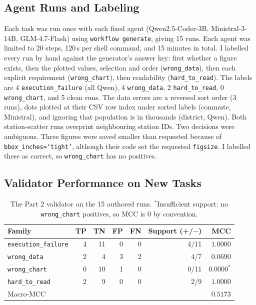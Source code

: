 \documentclass[11pt]{article}
\begin{document}
\subsection{Agent Runs and Labeling}
Each task was run once with each fixed agent (Qwen2.5-Coder-3B,
Ministral-3-14B, GLM-4.7-Flash) using \texttt{workflow generate}, giving 15
runs. Each agent was limited to 20 steps, 120\,s per shell command, and 15
minutes in total. I labelled every run by hand against the generator's answer
key: first whether a figure exists, then the plotted values, selection and
order (\texttt{wrong\_data}), then each explicit requirement
(\texttt{wrong\_chart}), then readability (\texttt{hard\_to\_read}). The labels
are 4 \texttt{execution\_failure} (all Qwen), 4 \texttt{wrong\_data}, 2 \texttt{hard\_to\_read},
0 \texttt{wrong\_chart}, and 5 clean runs. The data errors are a reversed sort
order (3 runs), dots plotted at their CSV row index under sorted labels
(commute, Ministral), and ignoring that population is in thousands (district,
Qwen). Both station-scatter runs overprint neighbouring station IDs. Two decisions were ambiguous. Three figures were saved
smaller than requested because of \texttt{bbox\_inches=`tight'}, although their
code set the requested \texttt{figsize}. I labelled these as correct, so
\texttt{wrong\_chart} has no positives.

\subsection{Validator Performance on New Tasks}

\begin{table}[h]
\centering
\begin{tabular}{lrrrrrr}
\toprule
Family & TP & TN & FP & FN & Support (+/$-$) & MCC \\
\midrule
\texttt{execution\_failure} & 4 & 11 & 0 & 0 & 4/11 & $1.0000$ \\
\texttt{wrong\_data}        & 2 & 4  & 3 & 2 & 4/7  & $0.0690$ \\
\texttt{wrong\_chart}       & 0 & 10 & 1 & 0 & 0/11 & $0.0000^{*}$ \\
\texttt{hard\_to\_read}     & 2 & 9  & 0 & 0 & 2/9  & $1.0000$ \\
\midrule
\multicolumn{6}{l}{Macro-MCC} & $0.5173$ \\
\bottomrule
\end{tabular}
\caption{The Part 2 validator on the 15 authored runs. $^{*}$Insufficient
support: no \texttt{wrong\_chart} positives, so MCC is 0 by convention.}
\label{tab:authored}
\end{table}
\end{document}
